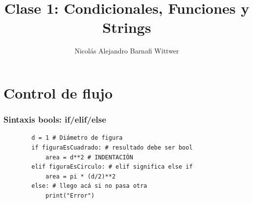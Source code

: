 \documentclass[14pt,aspectratio=169,xcolor=dvipsnames]{beamer}
\title[short title]{Clase 1: Condicionales, Funciones y Strings}
\subtitle{}
\author[NA Barnafi] {Nicolás Alejandro Barnafi Wittwer}
\institute[UC|CMM] 
{
    Pontificia Universidad Católica de Chile \\
    Centro de Modelamiento Matemático
}
\date{}
\begin{document}
\begin{frame}
    \maketitle
\end{frame}
\section{Control de flujo}
\begin{frame}[fragile]\frametitle{Sintaxis bools: if/elif/else}

    \begin{verbatim}
        d = 1 # Diámetro de figura
        if figuraEsCuadrado: # resultado debe ser bool
            area = d**2 # INDENTACIÓN
        elif figuraEsCirculo: # elif significa else if
            area = pi * (d/2)**2
        else: # llego acá si no pasa otra
            print("Error")
    \end{verbatim}    
\end{frame}
\end{document}
